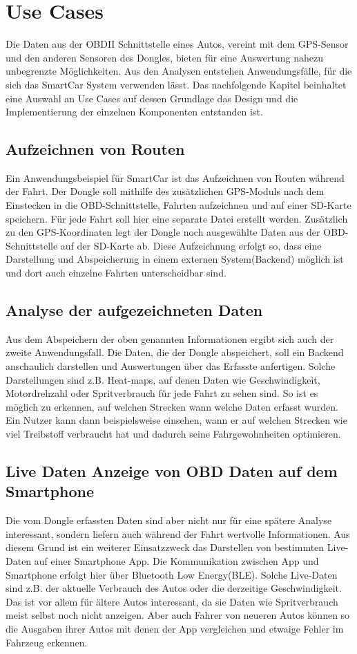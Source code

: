 \chapter{Use Cases}
\label{sec:useCases}
Die Daten aus der OBDII Schnittstelle eines Autos, vereint mit dem GPS-Sensor und den anderen Sensoren des Dongles, bieten für eine Auswertung nahezu unbegrenzte Möglichkeiten. Aus den Analysen entstehen Anwendungsfälle, für die sich das SmartCar System verwenden lässt. Das nachfolgende Kapitel beinhaltet eine Auswahl an Use Cases auf dessen Grundlage das Design und die Implementierung der einzelnen Komponenten entstanden ist.
\section{Aufzeichnen von Routen}
\label{uc:route}
Ein Anwendungsbeispiel für SmartCar ist das Aufzeichnen von Routen während der Fahrt. Der Dongle soll mithilfe des zusätzlichen GPS-Moduls nach dem Einstecken in die OBD-Schnittstelle,  Fahrten aufzeichnen und auf einer SD-Karte speichern. Für jede Fahrt soll hier eine separate Datei erstellt werden. Zusätzlich zu den GPS-Koordinaten legt der Dongle noch ausgewählte Daten aus der OBD-Schnittstelle auf der SD-Karte ab. Diese Aufzeichnung erfolgt so, dass eine Darstellung und Abspeicherung in einem externen System(Backend) möglich ist und dort auch einzelne Fahrten unterscheidbar sind.
\section{Analyse der aufgezeichneten Daten}
\label{Sec_AnayseDerAufgezeichnetenDaten}
\label{uc:analyse}
Aus dem Abspeichern der oben genannten Informationen ergibt sich auch der zweite Anwendungsfall. Die Daten, die der Dongle abspeichert, soll ein Backend anschaulich darstellen und Auswertungen über das Erfasste anfertigen. Solche Darstellungen sind z.B. Heat-maps, auf denen Daten wie Geschwindigkeit, Motordrehzahl oder Spritverbrauch für jede Fahrt zu sehen sind. So ist es möglich zu erkennen, auf welchen Strecken wann welche Daten erfasst wurden. Ein Nutzer kann dann beispielsweise einsehen, wann er auf welchen Strecken wie viel Treibstoff verbraucht hat und dadurch seine Fahrgewohnheiten optimieren.
\section{Live Daten Anzeige von OBD Daten auf dem Smartphone}
\label{uc:live}
Die vom Dongle erfassten Daten sind aber nicht nur für eine spätere Analyse interessant, sondern liefern auch während der Fahrt wertvolle Informationen. Aus diesem Grund ist ein weiterer Einsatzzweck das Darstellen von bestimmten Live-Daten auf einer Smartphone App. Die Kommunikation zwischen App und Smartphone erfolgt hier über Bluetooth Low Energy(BLE). Solche Live-Daten sind z.B. der aktuelle Verbrauch des Autos oder die derzeitige Geschwindigkeit. Das ist vor allem für ältere Autos interessant, da sie Daten wie Spritverbrauch meist selbst noch nicht anzeigen. Aber auch Fahrer von neueren Autos können so die Ausgaben ihrer Autos mit denen der App vergleichen und etwaige Fehler im Fahrzeug erkennen.
 
